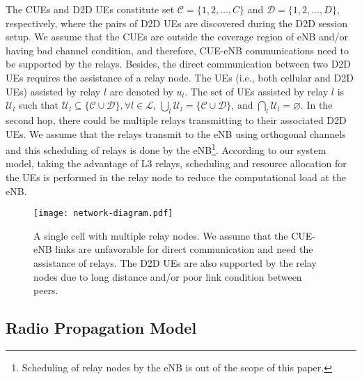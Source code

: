 \documentclass[twocolumn,10pt]{IEEEtran}
\begin{document}
The CUEs and D2D UEs constitute set $\mathcal{C} = \lbrace 1, 2, \ldots, C \rbrace$ and $\mathcal{D} = \lbrace 1, 2, \ldots, D \rbrace$, respectively, where the pairs of D2D UEs are discovered during the D2D session setup. We assume that the CUEs are outside the coverage region of eNB and/or having bad channel condition, and therefore, CUE-eNB communications need to be supported by the relays. Besides, the direct communication between two D2D UEs  requires the assistance of a relay node. The UEs (i.e., both cellular and D2D UEs) assisted by relay $l$ are denoted by $u_l$. The set of UEs assisted by relay $l$ is $\mathcal{U}_l$ such that $\mathcal{U}_l \subseteq \lbrace \mathcal{C} \cup \mathcal{D} \rbrace, \forall l \in \mathcal{L}$, $\bigcup_l \mathcal{U}_l = \lbrace \mathcal{C} \cup \mathcal{D} \rbrace$, and  $\bigcap_l \mathcal{U}_l = \varnothing$.  In the second hop, there could be multiple relays transmitting to their associated D2D UEs. We assume that the relays transmit to the eNB using orthogonal channels and this scheduling of relays is done by the eNB\footnote{Scheduling of relay nodes by the eNB is out of the scope of this paper.}. According to our system model, taking the advantage of L3 relays, scheduling and resource allocation for the UEs is performed in the relay node to reduce the computational load at the eNB. 
 

\begin{figure}[!t]
\centering
\texttt{[image: network-diagram.pdf]}
\caption{A single cell with multiple relay nodes. We assume that the CUE-eNB links are unfavorable for direct communication and need the assistance of relays. The D2D UEs are also supported by the relay nodes due to long distance and/or poor link condition between peers. 
} 
\label{fig:nw_diagram}
\end{figure}

\subsection{Radio Propagation Model}
\end{document}
